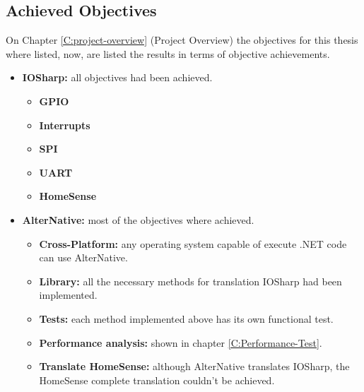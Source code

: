 \subsection{Achieved Objectives}\label{Conclusions-objectives}
On Chapter \ref{C:project-overview} (Project Overview) the objectives for this thesis where listed, now, are listed the results in terms of objective achievements.
\begin{itemize}
	\item \textbf{IOSharp:} all objectives had been achieved.
		\begin{itemize}
		\item \textbf{GPIO}
		\item \textbf{Interrupts}
		\item \textbf{SPI}
		\item \textbf{UART}
		\item \textbf{HomeSense}
		\end{itemize}
	\item \textbf{AlterNative:} most of the objectives where achieved.
		\begin{itemize}
		\item \textbf{Cross-Platform:} any operating system capable of execute .NET code can use AlterNative.
		\item \textbf{Library:} all the necessary methods for translation IOSharp had been implemented.
		\item \textbf{Tests:} each method implemented above has its own functional test.
		\item \textbf{Performance analysis:} shown in chapter \ref{C:Performance-Test}.
		\item \textbf{Translate HomeSense:} although AlterNative translates IOSharp, the HomeSense complete translation couldn't be achieved.
		\end{itemize}
\end{itemize}

